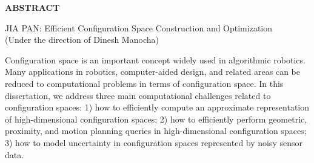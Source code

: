\begin{center}
\vspace*{52pt}
{\Large \textbf{ABSTRACT}}
\vspace{11pt}
\begin{singlespace}
JIA PAN: Efficient Configuration Space Construction and Optimization\\
(Under the direction of Dinesh Manocha)
\end{singlespace}
\end{center}

Configuration space is an important concept widely used in algorithmic robotics. Many applications in robotics, computer-aided design, and related areas can be reduced to computational problems in terms of configuration space. In this dissertation, we address three main computational challenges related to configuration spaces: 1) how to efficiently compute an approximate representation of high-dimensional configuration spaces; 2) how to efficiently perform geometric, proximity, and motion planning queries in high-dimensional configuration spaces; 3) how to model uncertainty in configuration spaces represented by noisy sensor data.


